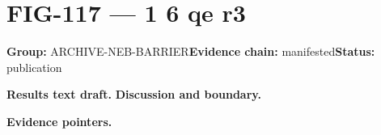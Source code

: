 \clearpage
\section{FIG-117 --- 1 6 qe r3}
\label{figpage:fig-117}
\textbf{Group:} ARCHIVE-NEB-BARRIER\quad \textbf{Evidence chain:} manifested\quad \textbf{Status:} publication

\textbf{Results text draft.} 
\textbf{Discussion and boundary.} 


\textbf{Evidence pointers.}



\vfill
